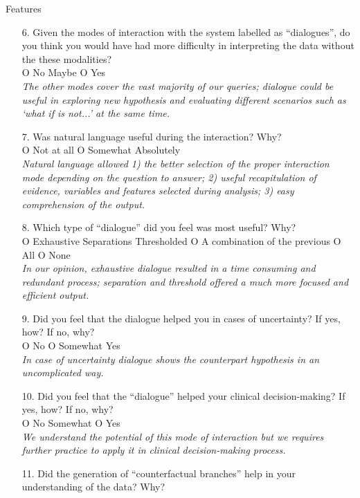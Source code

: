 \begin{mdframed}
	{\Large Features}
	\begin{enumerate}[resume]
		\item[6.] Given the modes of interaction with the system labelled as \enquote{dialogues}, do you think you would have had more difficulty in interpreting the data without the these modalities? \\
		O No  Maybe O Yes\\
		\textit{The other modes cover the vast majority of our queries; dialogue could be useful in exploring new hypothesis and evaluating different scenarios such as `what if is not...' at the same time.}
		\item[7.] Was natural language useful during the interaction?  Why? \\
		O Not at all O Somewhat  Absolutely\\
		\textit{Natural language allowed 1) the better selection of the proper interaction mode depending on the question to answer; 2) useful recapitulation of evidence, variables and features selected during analysis; 3) easy comprehension of the output.}
		\item[8.] Which type of \enquote{dialogue} did you feel was most useful? Why? \\
		O Exhaustive  Separations  Thresholded O A combination of the previous O All O None\\
		\textit{In our opinion, exhaustive dialogue resulted in a time consuming and redundant process; separation and threshold offered a much more focused and efficient output.}
		\item[9.] Did you feel that the dialogue helped you in cases of uncertainty?  If yes, how?  If no, why? \\
		O No O Somewhat  Yes\\
		\textit{In case of uncertainty dialogue shows the counterpart hypothesis in an uncomplicated way.}
		\item[10.] Did you feel that the \enquote{dialogue} helped your clinical decision-making?  If yes, how?  If no, why? \\
		O No  Somewhat O Yes\\
		\textit{We understand the potential of this mode of interaction but we requires further practice to apply it in clinical decision-making process.}
		\item[11.] Did the generation of \enquote{counterfactual branches} help in your understanding of the data?  Why? \\

\end{enumerate}
\end{mdframed}
